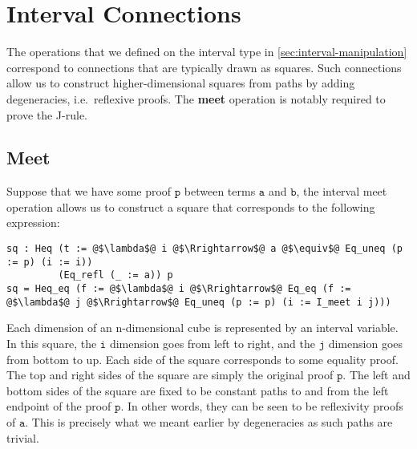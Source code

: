 \documentclass[12pt,twoside,maitrise]{dms}
\theoremstyle{definition}
\numberwithin{equation}{section}
\numberwithin{table}{chapter}
\numberwithin{figure}{chapter}
\newcommand\id[1] {\texttt{#1}}
\newcommand\fn[1] {\texttt{#1}}
\begin{document}
\section*{Interval Connections}\label{sec:interval-connections}

The operations that we defined on the interval type in
\autoref{sec:interval-manipulation} correspond to
connections\cite{cohen2016cubical} that are typically drawn as squares. Such
connections allow us to construct higher-dimensional squares from paths by
adding degeneracies, i.e.\ reflexive proofs. The \textbf{meet} operation is
notably required to prove the J-rule.

\subsection*{Meet}

Suppose that we have some proof $\fn{p}$ between terms $\fn{a}$ and $\fn{b}$,
the interval meet operation allows us to construct a square that corresponds to
the following expression:

\begin{verbatim}
sq : Heq (t := @$\lambda$@ i @$\Rrightarrow$@ a @$\equiv$@ Eq_uneq (p := p) (i := i))
         (Eq_refl (_ := a)) p
sq = Heq_eq (f := @$\lambda$@ i @$\Rrightarrow$@ Eq_eq (f := @$\lambda$@ j @$\Rrightarrow$@ Eq_uneq (p := p) (i := I_meet i j)))
\end{verbatim}

Each dimension of an n-dimensional cube is represented by an interval variable.
In this square, the $\id{i}$ dimension goes from left to right, and the $\id{j}$
dimension goes from bottom to up. Each side of the square corresponds to some
equality proof. The top and right sides of the square are simply the original
proof $\id{p}$. The left and bottom sides of the square are fixed to be constant
paths to and from the left endpoint of the proof $\id{p}$. In other words, they
can be seen to be reflexivity proofs of $\id{a}$. This is precisely what we
meant earlier by degeneracies as such paths are trivial.
\end{document}
